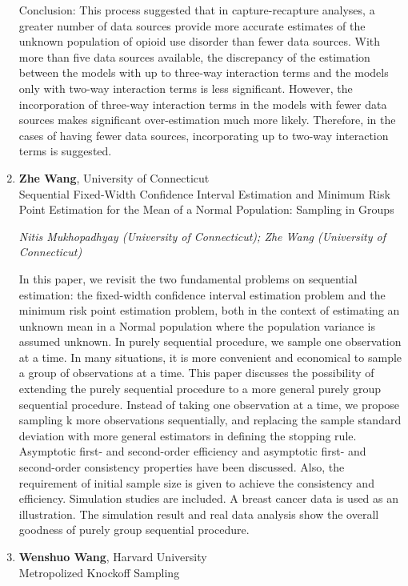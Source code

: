 \begin{enumerate}
Conclusion: This process suggested that in capture-recapture analyses, a greater number of data sources provide more accurate estimates of the unknown population of opioid use disorder than fewer data sources. With more than five data sources available, the discrepancy of the estimation between the models with up to three-way interaction terms and the models only with two-way interaction terms is less significant. However, the incorporation of three-way interaction terms in the models with fewer data sources makes significant over-estimation much more likely. Therefore, in the cases of having fewer data sources, incorporating up to two-way interaction terms is suggested.

\item \textbf{Zhe Wang}, University of Connecticut \\
Sequential Fixed-Width Confidence Interval Estimation and Minimum Risk Point Estimation for the Mean of a Normal Population: Sampling in Groups

\emph{\footnotesize Nitis Mukhopadhyay (University of Connecticut); Zhe Wang (University of Connecticut)}

In this paper, we revisit the two fundamental problems on sequential estimation: the fixed-width confidence interval estimation problem and the minimum risk point estimation problem, both in the context of estimating an unknown mean in a Normal population where the population variance is assumed unknown. In purely sequential procedure, we sample one observation at a time. In many situations, it is more convenient and economical to sample a group of observations at a time. This paper discusses the possibility of extending the purely sequential procedure to a more general purely group sequential procedure. Instead of taking one observation at a time, we propose sampling k more observations sequentially, and replacing the sample standard deviation with more general estimators in defining the stopping rule. Asymptotic first- and second-order efficiency and asymptotic first- and second-order consistency properties have been discussed. Also, the requirement of initial sample size is given to achieve the consistency and efficiency. Simulation studies are included. A breast cancer data is used as an illustration. The simulation result and real data analysis show the overall goodness of purely group sequential procedure.

\item \textbf{Wenshuo Wang}, Harvard University \\
Metropolized Knockoff Sampling


\end{enumerate}
